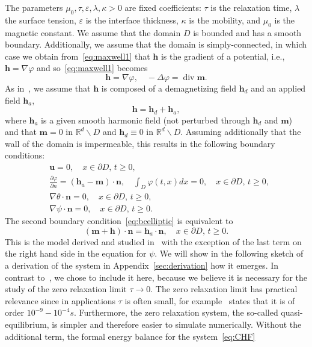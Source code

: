 \documentclass[10pt,letterpaper,twoside]{amsart}
\theoremstyle{definition}{\newtheorem{definition}[lemma]{Definition}}
\theoremstyle{note}{\newtheorem{claim}{Claim}[section]
\newtheorem*{claim*}{Claim}}
\numberwithin{equation}{section}
\newcommand{\dom}{D}
\newcommand{\R}{\mathbb{R}}
\newcommand{\Grad}{\nabla}
\newcommand{\Div}{\operatorname{div}}
\newcommand{\bu}{\mathbf{u}}
\newcommand{\bm}{\mathbf{m}}
\newcommand{\bh}{\mathbf{h}}
\newcommand{\normal}{\mathbf{n}}
\begin{document}
The parameters
 $\mu_0,\tau,\varepsilon,\lambda,\kappa >0$ are fixed coefficients: $\tau$ is the relaxation time, $\lambda$ the surface tension, $\varepsilon$ is the interface thickness, $\kappa$ is the mobility, and $\mu_0$ is the magnetic constant.
We assume that the domain $\dom$ is bounded and has a smooth boundary. Additionally, we assume that the domain is simply-connected, in which case we obtain from~\eqref{eq:maxwell1} that $\bh$ is the gradient of a potential, i.e.,  $\bh = \Grad\varphi$ and so~\eqref{eq:maxwell1} becomes
\begin{equation}
	\label{eq:elliptic}
	\bh = \Grad \varphi,\quad -\Delta \varphi = \Div\bm.
\end{equation}
As in~\cite{Nochetto2019,Nochetto2016b,Nochetto2016}, we assume that $\bh$ is composed of a demagnetizing field $\bh_d$ and an applied field $\bh_a$,
\begin{equation}
	\label{eq:decomph}
	\bh = \bh_d+\bh_a,
\end{equation}
where $\bh_a$ is a given smooth harmonic field (not perturbed through $\bh_d$ and $\bm$) and that $\bm=0$ in $\R^d\backslash \dom$ and $\bh_d\equiv 0$ in $\R^d\backslash\dom$. Assuming additionally that the wall of the domain is impermeable, this results in the following boundary conditions:
\begin{subequations}
    \label{eq:boundaryconditionsCahnHilliard}
    \begin{align}
        &\bu=0,\quad x\in\partial\dom,\, t\geq 0,\\
        &	\frac{\partial\varphi}{\partial n} = (\bh_a - \bm)\cdot \mathbf{n},\quad \int_{\dom} \varphi(t,x) dx =0,\quad x\in\partial\dom,\, t\geq 0, \label{eq:bcelliptic}\\
        & \Grad\theta\cdot\normal =0,\quad x\in\partial\dom,\, t\geq 0,\\
        & \Grad\psi\cdot \normal =0,\quad x\in\partial\dom,\, t\geq 0.
    \end{align}
\end{subequations}
The second boundary condition~\eqref{eq:bcelliptic} is equivalent to
\begin{equation*}
  (\bm+\bh)\cdot\normal = \bh_a\cdot\normal,\quad x\in \partial\dom, \, t\geq 0.
\end{equation*}
This is the model derived and studied in~\cite{Nochetto2016b} with the exception of the last term on the right hand side in the equation for $\psi$. We will show in the following sketch of a derivation of the system in Appendix~\ref{sec:derivation} how it emerges. In contrast to~\cite{Nochetto2016b}, we chose to include it here, because we believe it is necessary for the study of the zero relaxation limit $\tau\to 0$. The zero relaxation limit has practical relevance since in applications $\tau$ is often small, for example~\cite{Rinaldi2002,Shliomis2002} states that it is of order $10^{-9} - 10^{-4}s$. Furthermore, the zero relaxation system, the so-called quasi-equilibrium, is simpler and therefore easier to simulate numerically. Without the additional term, the formal energy balance for the system~\eqref{eq:CHF}
\end{document}
